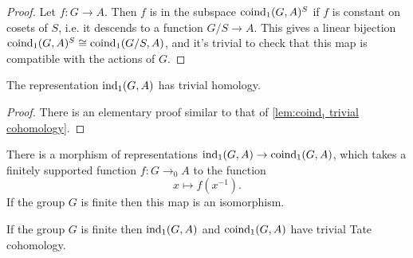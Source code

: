 \begin{proof}
	Let $f : G \to A$. Then $f$ is in the subspace $\mathrm{coind}_1(G,A)^S$ if $f$ is constant on
	cosets of $S$, i.e. it descends to a function $G/S \to A$.
	This gives a linear bijection $\mathrm{coind}_1(G,A)^S \cong \mathrm{coind}_1(G/S,A)$, and it's trivial to check
	that this map is compatible with the actions of $G$.
\end{proof}

\begin{lemma}	\label{lem:ind₁ trivial homology}
	\leanok
	The representation $\mathrm{ind}_1(G,A)$ has trivial homology.
\end{lemma}

\begin{proof}
	There is an elementary proof similar to that of \ref{lem:coind₁ trivial cohomology}.
\end{proof}

\begin{definition} \label{def:ind₁ to coind₁}
	\leanok
	There is a morphism of representations $\mathrm{ind}_1(G,A) \to \mathrm{coind}_1(G,A)$,
	which takes a finitely supported function $f : G \to_0 A$ to the function
	\[
		x \mapsto f(x^{-1}).
	\]
	If the group $G$ is finite then this map is an isomorphism.
\end{definition}

\begin{lemma}	\label{lem:induced trivial Tate}
	If the group $G$ is finite then $\mathrm{ind}_1(G,A)$ and $\mathrm{coind}_1(G,A)$ have trivial
	Tate cohomology.
\end{lemma}

